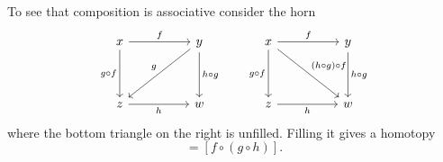 \documentclass[main.tex]{subfiles}
\begin{document}
\begin{definition}
\begin{itemize}
      To see that composition is associative consider the horn
      \begin{equation*}
        \begin{tikzcd}[row sep=huge, column sep=huge]
          x
          \arrow[r, "f"]
          \arrow[d, swap, "g \circ f"]
          & y
          \arrow[dl, swap, "g"]
          \arrow[d, "h \circ g"]
          \\
          z
          \arrow[r, swap, "h"]
          & w
        \end{tikzcd}
        \qquad
        \begin{tikzcd}[row sep=huge, column sep=huge]
          x
          \arrow[r, "f"]
          \arrow[d, swap, "g \circ f"]
          \arrow[dr, "(h \circ g) \circ f"]
          & y
          \arrow[d, "h \circ g"]
          \\
          z
          \arrow[r, swap, "h"]
          & w
        \end{tikzcd}
      \end{equation*}
      where the bottom triangle on the right is unfilled. Filling it gives a homotopy
      \begin{equation*}
        [(f \circ g) \circ h] = [f \circ (g \circ h)].
      \end{equation*}
  \end{itemize}

\end{definition}
\end{document}
